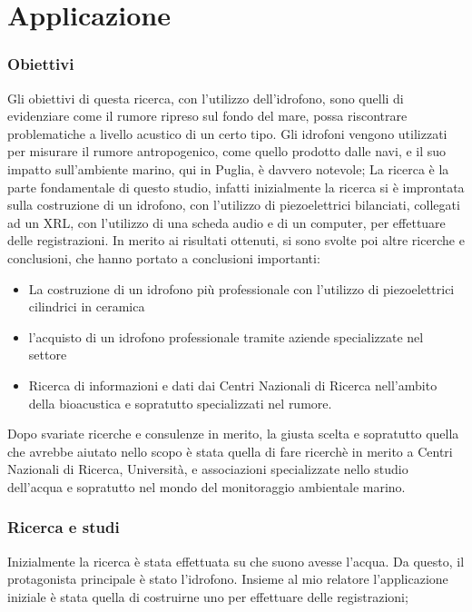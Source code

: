 \chapter{Applicazione}
\subsection{Obiettivi}
Gli obiettivi di questa ricerca, con l’utilizzo dell’idrofono, sono quelli di evidenziare come il rumore ripreso sul fondo del mare, possa riscontrare problematiche a livello acustico di un certo tipo.
Gli idrofoni vengono utilizzati per misurare il rumore antropogenico, come quello prodotto dalle navi, e il suo impatto sull'ambiente marino, qui in Puglia, è davvero notevole;
La ricerca è la parte fondamentale di questo studio, infatti inizialmente la ricerca si è improntata sulla costruzione di un idrofono, con l'utilizzo di piezoelettrici bilanciati, collegati ad un XRL, con l'utilizzo di una scheda audio e di un computer, per effettuare delle registrazioni. 
In merito ai risultati ottenuti, si sono svolte poi altre ricerche e conclusioni, che hanno portato a conclusioni importanti: 

\begin{itemize}
\item La costruzione di un idrofono più professionale con l'utilizzo di piezoelettrici cilindrici in ceramica\ 
\item l'acquisto di un idrofono professionale tramite aziende specializzate nel settore
\item Ricerca di informazioni e dati dai Centri Nazionali di Ricerca nell'ambito della bioacustica e sopratutto specializzati nel rumore. 
\end{itemize}

Dopo svariate ricerche e consulenze in merito, la giusta scelta e sopratutto quella che avrebbe aiutato nello scopo è stata quella di fare ricerchè in merito a Centri Nazionali di Ricerca, Università, e associazioni specializzate nello studio dell'acqua e sopratutto nel mondo del monitoraggio ambientale marino. 

\subsection{Ricerca e studi}
Inizialmente la ricerca è stata effettuata su che suono avesse l'acqua. Da questo, il protagonista principale è stato l'idrofono. 
Insieme al mio relatore l'applicazione iniziale è stata quella di costruirne uno per effettuare delle registrazioni;

